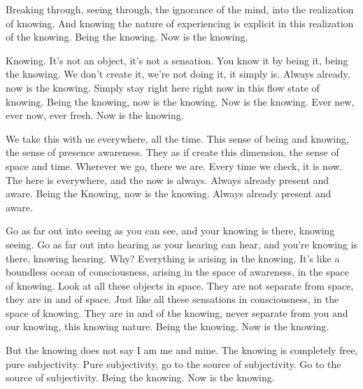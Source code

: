 \documentclass[12pt,openany]{book}
\begin{document}
Breaking through, seeing through, the ignorance of the mind, into the realization of knowing. And knowing the nature of experiencing is explicit in this realization of the knowing. Being the knowing. Now is the knowing.

Knowing. It's not an object, it’s not a sensation. You know it by being it, being the knowing. We don't create it, we’re not doing it, it simply is. Always already, now is the knowing. Simply stay right here right now in this flow state of knowing. Being the knowing, now is the knowing. Now is the knowing. Ever new, ever now, ever fresh. Now is the knowing.

We take this with us everywhere, all the time. This sense of being and knowing, the sense of presence awareness. They as if create this dimension, the sense of space and time. Wherever we go, there we are. Every time we check, it is now. The here is everywhere, and the now is always. Always already present and aware. Being the Knowing, now is the knowing. Always already present and aware.

Go as far out into seeing as you can see, and your knowing is there, knowing seeing. Go as far out into hearing as your hearing can hear, and you're knowing is there, knowing hearing. Why? Everything is arising in the knowing. It’s like a boundless ocean of consciousness, arising in the space of awareness, in the space of knowing. Look at all these objects in space. They are not separate from space, they are in and of space. Just like all these sensations in consciousness, in the space of knowing. They are in and of the knowing, never separate from you and our knowing, this knowing nature. Being the knowing. Now is the knowing.

But the knowing does not say I am me and mine. The knowing is completely free, pure subjectivity. Pure subjectivity, go to the source of subjectivity. Go to the source of subjectivity. Being the knowing. Now is the knowing.
\end{document}
